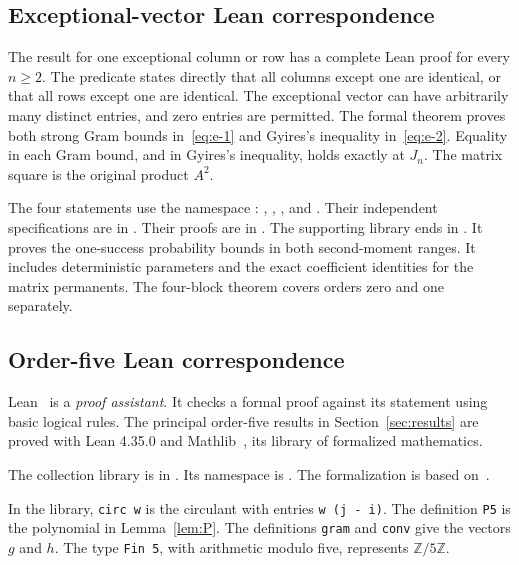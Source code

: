 \documentclass[11pt,a4paper]{article}
\theoremstyle{definition}
\theoremstyle{remark}
\begin{document}
\subsection{Exceptional-vector Lean correspondence}

The result for one exceptional column or row has a complete Lean proof for every $n\ge2$.
The predicate states directly that all columns except one are identical, or that all rows except one are identical.
The exceptional vector can have arbitrarily many distinct entries, and zero entries are permitted.
The formal theorem proves both strong Gram bounds in~\eqref{eq:e-1} and Gyires's inequality in~\eqref{eq:e-2}.
Equality in each Gram bound, and in Gyires's inequality, holds exactly at $J_n$.
The matrix square is the original product $A^2$.

The four statements use the namespace :
, , , and .
Their independent specifications are in .
Their proofs are in .
The supporting library ends in .
It proves the one-success probability bounds in both second-moment ranges.
It includes deterministic parameters and the exact coefficient identities for the matrix permanents.
The four-block theorem covers orders zero and one separately.

\subsection{Order-five Lean correspondence}
Lean~\cite{lean} is a \emph{proof assistant}. It checks a formal proof against
its statement using basic logical rules. The principal order-five results in
Section~\ref{sec:results} are proved with Lean 4.35.0 and
Mathlib~\cite{mathlib}, its library of formalized mathematics.

The collection library is in
.
Its namespace is .
The formalization is based on~\cite{repo}.

In the library, \texttt{circ w} is the circulant with entries
\texttt{w (j - i)}. The definition \texttt{P5} is the polynomial in
Lemma~\ref{lem:P}. The definitions \texttt{gram} and \texttt{conv} give
the vectors $g$ and $h$. The type \texttt{Fin 5}, with arithmetic modulo
five, represents $\mathbb Z/5\mathbb Z$.
\end{document}
